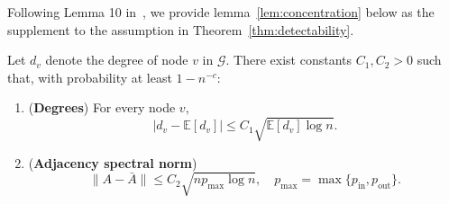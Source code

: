 Following Lemma 10 in~\parencite{avrachenkov2015pagerank}, we provide lemma~\ref{lem:concentration} below as the supplement to the assumption in Theorem~\ref{thm:detectability}.
\begin{lemma}
\label{lem:concentration}
Let $d_v$ denote the degree of node $v$ in $\mathcal{G}$. There exist constants $C_1,C_2>0$ such that, with probability at least $1-n^{-c}$:
\begin{enumerate}
\item[(i)] (\textbf{Degrees}) For every node $v$,
\[
    |d_v-\mathbb{E}[d_v]| \le C_1\sqrt{\mathbb{E}[d_v]\log n}.
\]
\item[(ii)] (\textbf{Adjacency spectral norm})
\[
    \|A-\bar A\| \le C_2\sqrt{n p_{\max}\log n}, \quad p_{\max} = \max\{p_{\mathrm{in}},p_{\mathrm{out}}\}.
\]
\end{enumerate}
\end{lemma}

